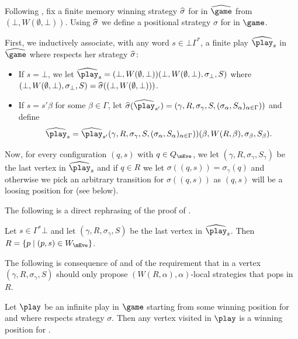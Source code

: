 Following , fix a finite memory winning strategy $\widehat{\sigma}$ for \Eve in $\hgame$ from $(\bot,W(\emptyset,\bot))$. Using $\widehat{\sigma}$ we define a positional strategy $\sigma$ for \Eve in $\game$. 

First, we inductively associate, with any word $s\in \bot \Gamma^*$, a finite play $\hplay_s$ in $\hgame$ where \Eve respects her strategy $\widehat{\sigma}$: 
\begin{itemize}
	\item If $s=\bot$, we let $\hplay_s = (\bot,W(\emptyset,\bot))(\bot,W(\emptyset,\bot),\sigma_\bot,S)$ where $(\bot,W(\emptyset,\bot),\sigma_\bot,S) = \widehat{\sigma}((\bot,W(\emptyset,\bot)))$.
	\item If $s=s'\beta$ for some $\beta\in\Gamma$, let $\hsigma(\hplay_{s'}) = (\gamma,R,\sigma_\gamma,S,(\sigma_\alpha,S_\alpha)_{\alpha\in\Gamma}))$ and define $$\hplay_{s}= \hplay_{s'}(\gamma,R,\sigma_\gamma,S,(\sigma_\alpha,S_\alpha)_{\alpha\in\Gamma}))(\beta,W(R,\beta),\sigma_\beta,S_\beta).$$
\end{itemize}

Now, for every configuration $(q,s)$ with $q\in Q_\mEve$, we let $(\gamma,R,\sigma_\gamma,S_\gamma)$ be the last vertex in $\hplay_s$ and if $q\in R$ we let $\sigma((q,s)) = \sigma_\gamma(q)$ and otherwise we pick an arbitrary transition for $\sigma((q,s))$ as $(q,s)$ will be a loosing position for \Eve (see  below).

The following is a direct rephrasing of the proof of .

\begin{proposition}\label{11-proposition:R-winning-states}
Let $s\in\Gamma^*\bot$ and let $(\gamma,R,\sigma_\gamma,S)$ be the last vertex in $\hplay_s$. Then $R=\{p\mid (p,s)\in W_\mEve\}$.
\end{proposition}

The following is  consequence of  and of the requirement that in a vertex $(\gamma,R,\sigma_\gamma,S)$ \Eve should only propose $(W(R,\alpha),\alpha)$-local strategies that pops in $R$.

\begin{proposition}\label{11-proposition:stays-in-winning-region}
Let $\play$ be an infinite play in $\game$ starting from some winning position for \Eve and where \Eve respects strategy $\sigma$. Then any vertex visited in $\play$ is a winning position for \Eve.
\end{proposition}

